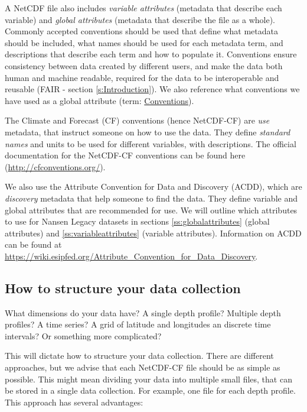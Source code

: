 \documentclass[a4paper,english, 11pt]{article}
\begin{document}
A NetCDF file also includes \textit{variable attributes} (metadata that describe each variable) and \textit{global attributes} (metadata that describe the file as a whole). Commonly accepted conventions should be used that define what metadata should be included,  what names should be used for each metadata term, and descriptions that describe each term and how to populate it. Conventions ensure consistency between data created by different users, and make the data both human and machine readable, required for the data to be interoperable and reusable (FAIR - section \ref{s:Introduction}). We also reference what conventions we have used as a global attribute (term: \href{https://www.unidata.ucar.edu/software/netcdf/conventions.html}{Conventions}). 

The Climate and Forecast (CF) conventions (hence NetCDF-CF) are \textit{use} metadata, that instruct someone on how to use the data. They define \textit{standard names} and units to be used for different variables, with descriptions. The official documentation for the NetCDF-CF conventions can be found here (\url{http://cfconventions.org/}).

We also use the Attribute Convention for Data and Discovery (ACDD), which are \textit{discovery} metadata that help someone to find the data. They define variable and global attributes that are recommended for use. We will outline which attributes to use for Nansen Legacy datasets in sections \ref{ss:globalattributes} (global attributes) and \ref{ss:variableattributes} (variable attributes). Information on ACDD can be found at \url{https://wiki.esipfed.org/Attribute_Convention_for_Data_Discovery}. 

\subsection{How to structure your data collection}
\label{ss:structurecollection}

What dimensions do your data have? A single depth profile? Multiple depth profiles? A time series? A grid of latitude and longitudes an discrete time intervals? Or something more complicated?

This will dictate how to structure your data collection. There are different approaches, but we advise that each NetCDF-CF file should be as simple as possible. This might mean dividing your data into multiple small files, that can be stored in a single data collection. For example, one file for each depth profile. This approach has several advantages:
\end{document}

